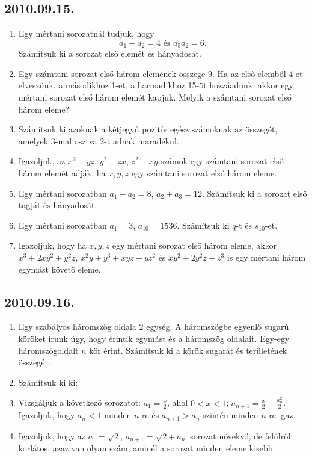 \subsection*{2010.09.15.}
\begin{enumerate}
\item Egy mértani sorozatnál tudjuk, hogy 
$$a_1+a_2=4\text{~és~}a_5a_2=6.$$
Számítsuk ki a sorozat első elemét és hányadosát.
\item Egy számtani sorozat első három elemének összege 9. Ha az első elemből 4-et elveszünk, a másodikhoz 1-et, a harmadikhoz 15-öt hozzáadunk, akkor egy mértani sorozat első három elemét kapjuk. Melyik a számtani sorozat első három eleme?
\item Számítsuk ki azoknak a kétjegyű pozitív egész számoknak az összegét, amelyek 3-mal osztva 2-t adnak maradékul.
\item Igazoljuk, az $x^2-yz$, $y^2-zx$, $z^2-xy$ számok egy számtani sorozat első három elemét adják, ha $x,y,z$ egy számtani sorozat első három eleme.
\item Egy mértani sorozatban $a_1-a_2=8$, $a_2+a_3=12$. Számítsuk ki a sorozat első tagját és hányadosát.
\item Egy mértani sorozatban $a_1=3$, $a_{10}=1536$. Számítsuk ki $q$-t és $s_{10}$-et.
\item Igazoljuk, hogy ha $x,y,z$ egy mértani sorozat első három eleme, akkor 
$x^3+2xy^2+y^2z$,
$x^2y+y^3+xyz+yz^2$ és 
$xy^2+2y^2z+z^3$ is egy mértani három egymást követő eleme.
\end{enumerate}


\subsection*{2010.09.16.}
\begin{enumerate}
\item Egy szabályos háromszög oldala 2 egység. A háromszögbe egyenlő sugarú köröket írunk úgy, hogy érintik egymást és a háromszög oldalait. Egy-egy háromszögoldalt $n$ kör érint. Számítsuk ki a körök sugarát és területének összegét.
\item Számítsuk ki ki:
\item Vizsgáljuk a következő sorozatot:
$a_1=\frac{x}{2}$, ahol $0<x<1$; $a_{n+1}=\frac{x}{2}+\frac{a_n^2}{2}$. Igazoljuk, hogy $a_n<1$ minden $n$-re és $a_{n+1}>a_n$ szintén minden $n$-re igaz.

\item Igazoljuk, hogy az $a_1=\sqrt 2$, $a_{n+1}=\sqrt{2+a_n}$ sorozat növekvő, de felülről korlátos, azaz van olyan szám, aminél a sorozat minden eleme kisebb.
\end{enumerate}


